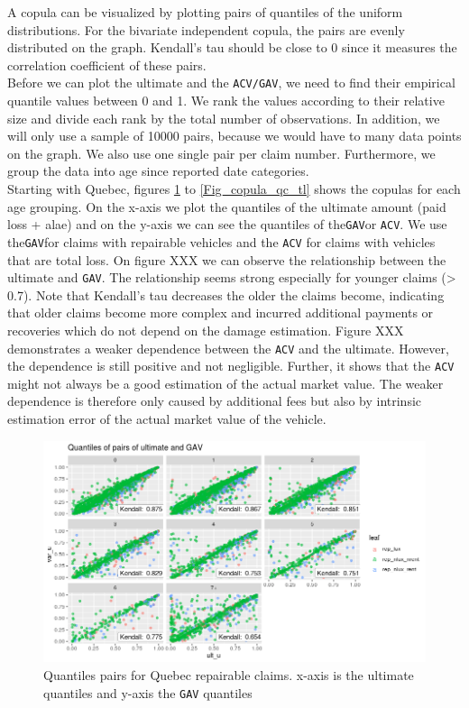 	A copula can be visualized by plotting pairs of quantiles of the uniform distributions. For the bivariate independent copula, the pairs are evenly distributed on the graph. Kendall’s tau should be close to 0 since it measures the correlation coefficient of these pairs. \\
	Before we can plot the ultimate and the \texttt{ACV/GAV}, we need to find their empirical quantile values between 0 and 1. We rank the values according to their relative size and divide each rank by the total number of observations. In addition, we will only use a sample of 10000 pairs, because we would have to many data points on the graph. We also use one single pair per claim number. Furthermore, we group the data into age since reported date categories. \\
	Starting with Quebec, figures \ref{Fig_copula_qc_rep} to \ref{Fig_copula_qc_tl} shows the copulas for each age grouping. On the x-axis we plot the quantiles of the ultimate amount (paid loss + alae) and on the y-axis we can see the quantiles of the\texttt{GAV}or \texttt{ACV}. We use the\texttt{GAV}for claims with repairable vehicles and the \texttt{ACV} for claims with vehicles that are total loss. On figure XXX we can observe the relationship between the ultimate and \texttt{GAV}. The relationship seems strong especially for younger claims (> 0.7). Note that Kendall’s tau decreases the older the claims become, indicating that older claims become more complex and incurred additional payments or recoveries which do not depend on the damage estimation. Figure XXX demonstrates a weaker dependence between the \texttt{ACV} and the ultimate. However, the dependence is still positive and not negligible. Further, it shows that the \texttt{ACV} might not always be a good estimation of the actual market value. The weaker dependence is therefore only caused by additional fees but also by intrinsic estimation error of the actual market value of the vehicle. 
	
	\begin{figure}[H]
		\begin{center}
			\includegraphics[scale=0.4]{Graphiques/qc_rep} 
			\renewcommand{\figurename}{Figure}
			\caption{Quantiles pairs for Quebec repairable claims. x-axis is the ultimate quantiles and y-axis the \texttt{GAV} quantiles}\label{Fig_copula_qc_rep}
		\end{center}
	\end{figure}

